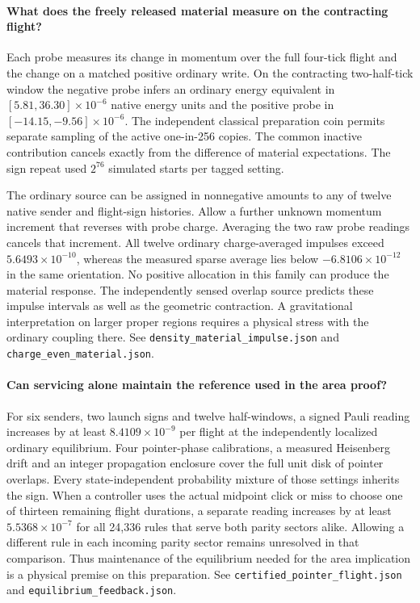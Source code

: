 \documentclass[11pt]{article}
\begin{document}
\paragraph{What does the freely released material measure on the contracting flight?}
Each probe measures its change in momentum over the full four-tick
flight and the change on a matched positive ordinary write. On the
contracting two-half-tick window the negative probe infers an ordinary
energy equivalent in \([5.81,36.30]\times10^{-6}\) native energy units
and the positive probe in \([-14.15,-9.56]\times10^{-6}\).
The independent classical preparation coin permits separate sampling of
the active one-in-256 copies. The common inactive contribution cancels
exactly from the difference of material expectations. The sign repeat
used \(2^{76}\) simulated starts per tagged setting.

The ordinary source can be assigned in nonnegative amounts to any of
twelve native sender and flight-sign histories. Allow a further unknown
momentum increment that reverses with probe charge. Averaging the two
raw probe readings cancels that increment. All twelve ordinary
charge-averaged impulses exceed \(5.6493\times10^{-10}\), whereas
the measured sparse average lies below \(-6.8106\times10^{-12}\) in
the same orientation. No positive allocation in this family can
produce the material response. The independently sensed overlap source
predicts these impulse intervals as well as the geometric contraction.
A gravitational interpretation on larger proper regions requires a
physical stress with the ordinary coupling there. See
\texttt{density\_material\_impulse.json} and
\texttt{charge\_even\_material.json}.

\paragraph{Can servicing alone maintain the reference used in the area proof?}
For six senders, two launch signs and twelve half-windows, a signed
Pauli reading increases by at least \(8.4109\times10^{-9}\) per
flight at the independently localized ordinary equilibrium. Four
pointer-phase calibrations, a measured Heisenberg drift and an
integer propagation enclosure cover the full unit disk of pointer
overlaps. Every state-independent probability mixture of those
settings inherits the sign. When a controller uses the actual midpoint
click or miss to choose one of thirteen remaining flight durations, a
separate reading increases by at least \(5.5368\times10^{-7}\) for
all 24,336 rules that serve both parity sectors alike. Allowing a
different rule in each incoming parity sector remains unresolved in
that comparison. Thus maintenance of the equilibrium needed for the
area implication is a physical premise on this preparation. See
\texttt{certified\_pointer\_flight.json} and
\texttt{equilibrium\_feedback.json}.
\end{document}
